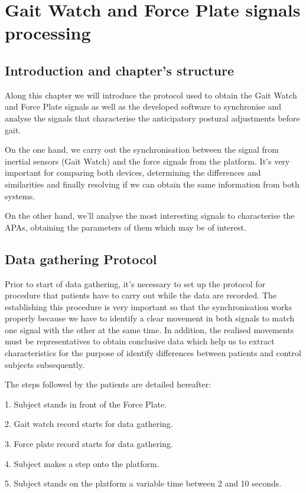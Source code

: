 \chapter{Gait Watch and Force Plate signals processing}
\label{ch:GWandFP}

\section{Introduction and chapter's structure}
Along this chapter we will introduce the protocol used to obtain the Gait Watch and Force Plate signals as well as the developed software to synchronise and analyse the signals that characterise the anticipatory postural adjustments before gait.

On the one hand, we carry out the synchronisation between the signal from inertial sensors (Gait Watch) and the force signals from the platform. It's very important for comparing both devices, determining the differences and similarities and finally resolving if we can obtain the same information from both systems.

On the other hand, we’ll analyse the most interesting signals to characterise the APAs, obtaining the parameters of them which may be of interest.


\section{Data gathering Protocol}
Prior to start of data gathering, it’s necessary to set up the protocol for procedure that patients have to carry out while the data are recorded. The establishing this procedure is very important so that the synchronisation works properly because we have to identify a clear movement in both signals to match one signal with the other at the same time.
In addition, the realised movements must be representatives to obtain conclusive data which help us to extract characteristics for the purpose of identify differences between patients and control subjects subsequently.

The steps followed by the patients are detailed hereafter:

1.	Subject stands in front of the Force Plate.

2.	Gait watch record starts for data gathering.

3.	Force plate record starts for data gathering.

4.	Subject makes a step onto the platform.

5.	Subject stands on the platform a variable time between 2 and 10 seconds.

